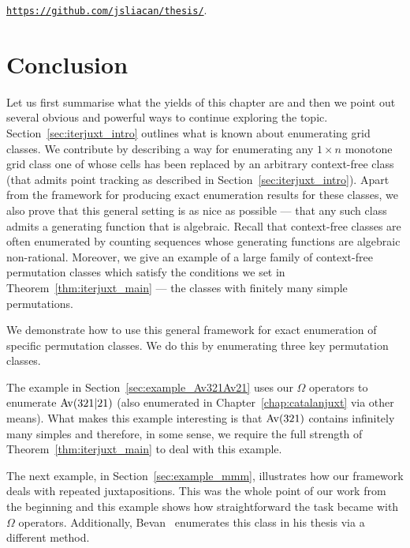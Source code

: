 \documentclass[12pt, a4paper, twoside]{report}
\begin{document}
\begin{center}\href{https://github.com/jsliacan/thesis}{\texttt{https://github.com/jsliacan/thesis/}}.\end{center}


\section{Conclusion}
\label{sec:iterjuxt_conclusion}
Let us first summarise what the yields of this chapter are and then we point out several obvious and powerful ways to continue exploring the topic. Section~\ref{sec:iterjuxt_intro} outlines what is known about enumerating grid classes. We contribute by describing a way for enumerating any $1\times n$ monotone grid class one of whose cells has been replaced by an arbitrary context-free class (that admits point tracking as described in Section~\ref{sec:iterjuxt_intro}). Apart from the framework for producing exact enumeration results for these classes, we also prove that this general setting is as nice as possible --- that any such class admits a generating function that is algebraic. Recall that context-free classes are often enumerated by counting sequences whose generating functions are algebraic non-rational. Moreover, we give an example of a large family of context-free permutation classes which satisfy the conditions we set in Theorem~\ref{thm:iterjuxt_main} --- the classes with finitely many simple permutations.

We demonstrate how to use this general framework for exact enumeration of specific permutation classes. We do this by enumerating three key permutation classes.

The example in Section~\ref{sec:example_Av321Av21} uses our $\Omega$ operators to enumerate $\mathrm{Av}(321|21)$ (also enumerated in Chapter~\ref{chap:catalanjuxt} via other means). What makes this example interesting is that $\mathrm{Av}(321)$ contains infinitely many simples and therefore, in some sense, we require the full strength of Theorem~\ref{thm:iterjuxt_main} to deal with this example.

The next example, in Section~\ref{sec:example_mmm}, illustrates how our framework deals with repeated juxtapositions. This was the whole point of our work from the beginning and this example shows how straightforward the task became with $\Omega$ operators. Additionally, Bevan~\cite{bevan2015thesis} enumerates this class in his thesis via a different method.
\end{document}
